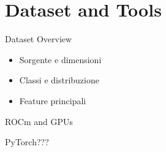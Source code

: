 \section{Dataset and Tools}
\begin{frame}{Dataset Overview}
  \begin{itemize}
    \item Sorgente e dimensioni
    \item Classi e distribuzione
    \item Feature principali
  \end{itemize}
\end{frame}

\begin{frame}{ROCm and GPUs}
\end{frame}

\begin{frame}{PyTorch???}
\end{frame}

